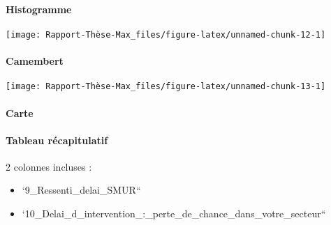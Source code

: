 \documentclass[
]{article}
\begin{document}
\paragraph{Histogramme}\label{histogramme}

\begin{center}\texttt{[image: Rapport-Thèse-Max\_files/figure-latex/unnamed-chunk-12-1]} \end{center}

\paragraph{Camembert}\label{camembert}

\begin{center}\texttt{[image: Rapport-Thèse-Max\_files/figure-latex/unnamed-chunk-13-1]} \end{center}

\paragraph{Carte}\label{carte-1}

\paragraph{Tableau récapitulatif}\label{tableau-ruxe9capitulatif}

2 colonnes incluses :

\begin{itemize}
\item
  `9\_Ressenti\_delai\_SMUR``
\item
  `10\_Delai\_d\_intervention\_:\_perte\_de\_chance\_dans\_votre\_secteur``
\end{itemize}
\end{document}
